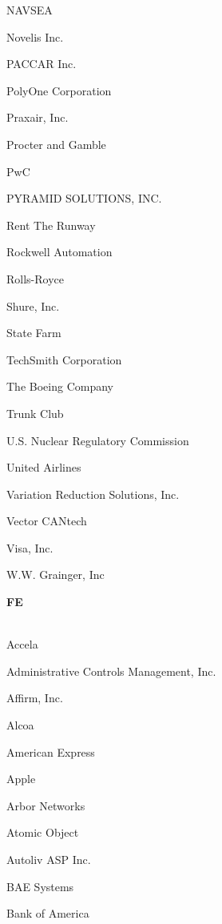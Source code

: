 \documentclass[twoside]{article}
\begin{document}
\begin{center}
\begin{multicols}{5}
\begin{FlushLeft}
\begin{compactitem}
\item NAVSEA
\item Novelis Inc.
\item PACCAR Inc.
\item PolyOne Corporation
\item Praxair, Inc.
\item Procter and Gamble
\item PwC
\item PYRAMID SOLUTIONS, INC.
\item Rent The Runway
\item Rockwell Automation
\item Rolls-Royce
\item Shure, Inc.
\item State Farm
\item TechSmith Corporation
\item The Boeing Company
\item Trunk Club
\item U.S. Nuclear Regulatory Commission
\item United Airlines
\item Variation Reduction Solutions, Inc.
\item Vector CANtech
\item Visa, Inc.
\item W.W. Grainger, Inc
\end{compactitem}
        \end{FlushLeft}
        \vspace{1em}
        {\fontsize{14}{16}\selectfont \bf FE}\\
        \vspace{-1em}
        ~\hrulefill~
        \vspace{-.9em}
        \begin{FlushLeft}
        \begin{compactitem}
        \item Accela
\item Administrative Controls Management, Inc.
\item Affirm, Inc.
\item Alcoa
\item American Express
\item Apple
\item Arbor Networks
\item Atomic Object
\item Autoliv ASP Inc.
\item BAE Systems
\item Bank of America

\end{compactitem}
\end{FlushLeft}
\end{multicols}
\end{center}
\end{document}
